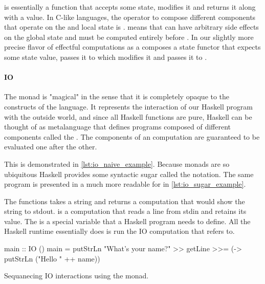    is essentially a function that accepts some state, modifies it
  and returns it along with a value. In C-like languages, the operator to
  compose different components that operate on the and local state is
  \cpp{;}.  means that  can have arbitrary side effects on
  the global state and must be computed entirely before . In our
  slightly more precise flavor of effectful computations  as a
   composes a state functor that expects some state value, passes
  it to  which modifies it and passes it to .

  \paragraph{IO}

  The  monad is "magical" in the sense that it is completely
  opaque to the constructs of the language. It represents the interaction of our Haskell
  program with the outside world, and since all Haskell functions are
  pure, Haskell can be thought of as metalanguage that defines programs
  composed of different  components called the . The components of an  computation are guaranteed to
  be evaluated one after the other.

  This is demonstrated in \ref{lst:io_naive_example}. Because monads are so
  ubiquitous Haskell provides some syntactic sugar called the 
  notation. The same program is presented in a much more readable for in
  \ref{lst:io_sugar_example}.

  The functions  takes a string and returns
  a computation that would show the string to stdout.  is a computation that reads a line from stdin and retains its
  value. The  is a special variable that a Haskell
  program needs to define. All the Haskell runtime essentially does is
  run the IO computation that  refers to.

  \begin{code}
\begin{haskellcode}
main :: IO ()
main = putStrLn "What's your name?"
       >> getLine
       >>= (\name -> putStrLn ("Hello " ++ name))
\end{haskellcode}
    \caption{\label{lst:io_naive_example}Sequanecing IO interactions
      using the  monad.}
  \end{code}

